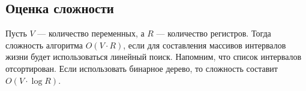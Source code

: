 \begin{example}
\end{example}

\subsection{Оценка сложности}

Пусть $V$ --- количество переменных, а $R$ --- количество регистров.
Тогда сложность алгоритма $\textit{O}(V \cdot R)$, если для составления массивов интервалов жизни будет использоваться
линейный поиск.
Напомним, что список интервалов отсортирован.
Если использовать бинарное дерево, то сложность составит $\textit{O}(V \cdot \log R)$.
